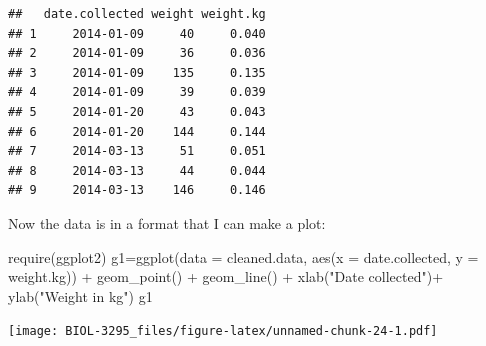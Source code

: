 \documentclass[
]{book}
\newenvironment{Shaded}{\begin{snugshade}}{\end{snugshade}}
\newcommand{\AttributeTok}[1]{\textcolor[rgb]{0.77,0.63,0.00}{#1}}
\newcommand{\FunctionTok}[1]{\textcolor[rgb]{0.00,0.00,0.00}{#1}}
\newcommand{\NormalTok}[1]{#1}
\newcommand{\OtherTok}[1]{\textcolor[rgb]{0.56,0.35,0.01}{#1}}
\newcommand{\SpecialCharTok}[1]{\textcolor[rgb]{0.00,0.00,0.00}{#1}}
\newcommand{\StringTok}[1]{\textcolor[rgb]{0.31,0.60,0.02}{#1}}
\begin{document}
\begin{verbatim}
##   date.collected weight weight.kg
## 1     2014-01-09     40     0.040
## 2     2014-01-09     36     0.036
## 3     2014-01-09    135     0.135
## 4     2014-01-09     39     0.039
## 5     2014-01-20     43     0.043
## 6     2014-01-20    144     0.144
## 7     2014-03-13     51     0.051
## 8     2014-03-13     44     0.044
## 9     2014-03-13    146     0.146
\end{verbatim}

Now the data is in a format that I can make a plot:

\begin{Shaded}
\begin{Highlighting}[]
\FunctionTok{require}\NormalTok{(ggplot2)}
\NormalTok{g1}\OtherTok{=}\FunctionTok{ggplot}\NormalTok{(}\AttributeTok{data =}\NormalTok{ cleaned.data, }\FunctionTok{aes}\NormalTok{(}\AttributeTok{x =}\NormalTok{ date.collected, }\AttributeTok{y =}\NormalTok{ weight.kg)) }\SpecialCharTok{+} 
  \FunctionTok{geom\_point}\NormalTok{() }\SpecialCharTok{+}
  \FunctionTok{geom\_line}\NormalTok{() }\SpecialCharTok{+}
  \FunctionTok{xlab}\NormalTok{(}\StringTok{"Date collected"}\NormalTok{)}\SpecialCharTok{+}
  \FunctionTok{ylab}\NormalTok{(}\StringTok{"Weight in kg"}\NormalTok{)}
\NormalTok{g1}
\end{Highlighting}
\end{Shaded}

\texttt{[image: BIOL-3295\_files/figure-latex/unnamed-chunk-24-1.pdf]}
\end{document}
